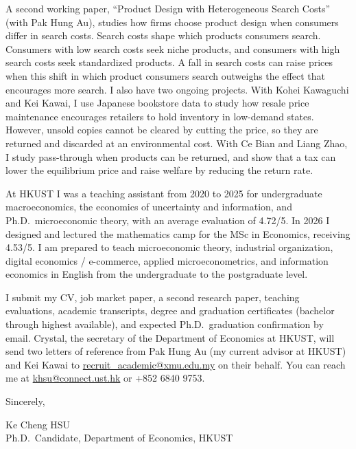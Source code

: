 \documentclass[11pt]{article}
\begin{document}
A second working paper, ``Product Design with Heterogeneous Search Costs'' (with Pak Hung Au), studies how firms choose product design when consumers differ in search costs. Search costs shape which products consumers search. Consumers with low search costs seek niche products, and consumers with high search costs seek standardized products. A fall in search costs can raise prices when this shift in which product consumers search outweighs the effect that encourages more search. I also have two ongoing projects. With Kohei Kawaguchi and Kei Kawai, I use Japanese bookstore data to study how resale price maintenance encourages retailers to hold inventory in low-demand states. However, unsold copies cannot be cleared by cutting the price, so they are returned and discarded at an environmental cost. With Ce Bian and Liang Zhao, I study pass-through when products can be returned, and show that a tax can lower the equilibrium price and raise welfare by reducing the return rate.

At HKUST I was a teaching assistant from 2020 to 2025 for undergraduate macroeconomics, the economics of uncertainty and information, and Ph.D.\ microeconomic theory, with an average evaluation of 4.72/5. In 2026 I designed and lectured the mathematics camp for the MSc in Economics, receiving 4.53/5. I am prepared to teach microeconomic theory, industrial organization, digital economics / e-commerce, applied microeconometrics, and information economics in English from the undergraduate to the postgraduate level.

I submit my CV, job market paper, a second research paper, teaching evaluations, academic transcripts, degree and graduation certificates (bachelor through highest available), and expected Ph.D.\ graduation confirmation by email. Crystal, the secretary of the Department of Economics at HKUST, will send two letters of reference from Pak Hung Au (my current advisor at HKUST) and Kei Kawai to \href{mailto:recruit\_academic@xmu.edu.my}{recruit\_academic@xmu.edu.my} on their behalf. You can reach me at \href{mailto:khsu@connect.ust.hk}{khsu@connect.ust.hk} or +852 6840 9753.

\vspace{0.2em}
Sincerely,

\vspace{0.2em}
Ke Cheng HSU \\
Ph.D.\ Candidate, Department of Economics, HKUST
\end{document}
